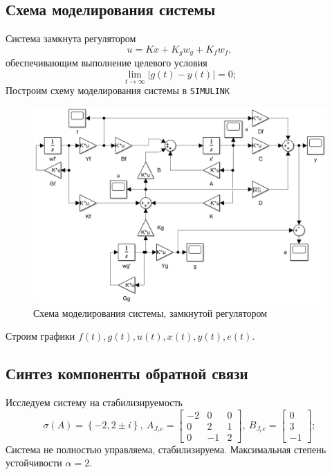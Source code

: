 \documentclass[a4paper, 12pt]{article}
\begin{document}
    \subsection{Схема моделирования системы}
    Система замкнута регулятором
    $$
    u=Kx+K_gw_g+K_fw_f,
    $$
    обеспечивающим выполнение целевого условия
    $$
    \lim\limits_{t\to\infty}|g(t)-y(t)|=0;
    $$
    Построим схему моделирования системы в \texttt{SIMULINK}
    \begin{figure}[H]
        \centering
        \includegraphics[scale=0.5]{1task_scheme.png}
        \captionsetup{skip=0pt}
        \caption{Схема моделирования системы, замкнутой регулятором}
        \label{fig:1task_scheme}
    \end{figure}
    \noindent Строим графики $f(t),g(t),u(t),x(t),y(t),e(t)$.


    \subsection{Синтез компоненты обратной связи}
    Исследуем систему на стабилизируемость
    $$
    \sigma\left( A \right)=\left\{ -2,2\pm i \right\},\ A_{J_re}=\begin{bmatrix}
        -2 &0 &0\\
        0 &2 &1\\
        0 &-1 &2
    \end{bmatrix},\ B_{J_re}=\begin{bmatrix}
        0\\3\\-1
    \end{bmatrix};
    $$
    Система не полностью управляема, стабилизируема. Максимальная степень
    устойчивости $\alpha=2$.
\end{document}
